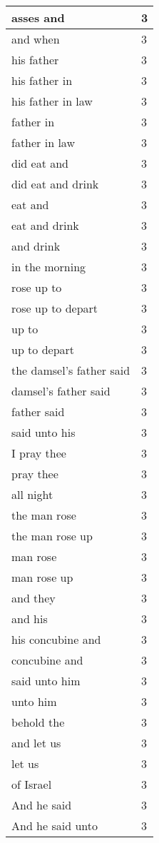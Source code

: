 \begin{center}
\begin{longtable}{|p{3.0in}|p{0.5in}|}
asses and & 3\\ \hline 
and when & 3\\ \hline 
his father & 3\\ \hline 
his father in & 3\\ \hline 
his father in law & 3\\ \hline 
father in & 3\\ \hline 
father in law & 3\\ \hline 
did eat and & 3\\ \hline 
did eat and drink & 3\\ \hline 
eat and & 3\\ \hline 
eat and drink & 3\\ \hline 
and drink & 3\\ \hline 
in the morning & 3\\ \hline 
rose up to & 3\\ \hline 
rose up to depart & 3\\ \hline 
up to & 3\\ \hline 
up to depart & 3\\ \hline 
the damsel's father said & 3\\ \hline 
damsel's father said & 3\\ \hline 
father said & 3\\ \hline 
said unto his & 3\\ \hline 
I pray thee & 3\\ \hline 
pray thee & 3\\ \hline 
all night & 3\\ \hline 
the man rose & 3\\ \hline 
the man rose up & 3\\ \hline 
man rose & 3\\ \hline 
man rose up & 3\\ \hline 
and they & 3\\ \hline 
and his & 3\\ \hline 
his concubine and & 3\\ \hline 
concubine and & 3\\ \hline 
said unto him & 3\\ \hline 
unto him & 3\\ \hline 
behold the & 3\\ \hline 
and let us & 3\\ \hline 
let us & 3\\ \hline 
of Israel & 3\\ \hline 
And he said & 3\\ \hline 
And he said unto & 3\\ \hline 

\end{longtable}
\end{center}
